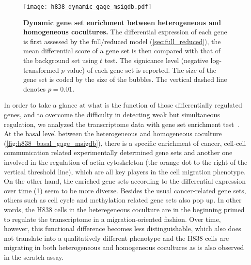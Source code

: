 \begin{figure}[!ht]
\begin{center}
\texttt{[image: h838\_dynamic\_gage\_msigdb.pdf]}
\end{center}
\caption[Dynamic gene set enrichment]{
{\bf Dynamic gene set enrichment between heterogeneous and homogeneous 
cocultures.} 
The differential expression of each gene is first assessed by the full/reduced
model (\ref{sec:full_reduced}), the mean differential score of a gene set
is then compared with that of the background set using $t$ test.
The signicance level (negative log-transformed $p$-value) of
each gene set is reported. The size
of the gene set is coded by the size of the bubbles.
The vertical dashed line denotes $p=0.01$.
}
\label{fig:h838_dynamic_gage_msigdb}
\end{figure}

In order to take a glance at what is the function of those
differentially regulated genes, and to overcome the difficulty in detecting weak
but simultaneous regulation, we analyzed the transcriptome data with gene set
enrichment test~\citep{Luo2009}.
At the basal level between the heterogeneous and homogeneous
coculture
(\ref{fig:h838_basal_gage_msigdb}),
there is a specific enrichment of cancer, 
cell-cell communication
related experimentally determined gene sets and another one 
involved in the regulation
of actin-cytoskeleton (the orange dot to the right of the 
vertical threshold line), which are all key players in the
cell migration phenotype.
On the other hand, the enriched gene sets
according to the differential expression over time 
(\ref{fig:h838_dynamic_gage_msigdb})
seem to be more diverse. Besides the usual cancer-related 
gene sets, others such as cell cycle and methylation related
gene sets also pop up.
In other words, the H838 cells in the heteregeneous coculture
are in the beginning primed to regulate the transcriptome in
a migration-oriented fashion.
Over time, however, this functional difference becomes less
distinguishable,
which also does not translate into a qualitatively different 
phenotype and the H838 cells are migrating 
in both heterogeneous and
homogeneous cocultures 
as is also observed in the scratch assay.

